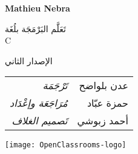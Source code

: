 \thispagestyle{empty}
\cleardoublepage
\thispagestyle{empty}
\begin{center}
{\fontsize{0.7cm}{1.4cm}\selectfont\bfseries
\textcolor{section}{\textenglish{Mathieu Nebra}}
}

\vspace{1cm}
\textcolor{chapter}{\mdseries
{\fontsize{2cm}{4cm}\selectfont
تَعَلَّم البَرْمَجَة بلُغَة}\\
{\fontsize{3cm}{6cm}\selectfont
\textenglish{C}
}
}

\vspace{1cm}
{
\fontsize{0.85cm}{1cm}\selectfont
الإصدار الثاني
}
\vfill

{
\fontsize{0.5cm}{1.5cm}\selectfont

\begin{tabu} to 0.5
تَرْجَمَة & عدن بلواضح\\
مُرَاجَعَة وإعْدَاد & حمزة عبّاد\\
تَصميم الغلاف & أحمد زبوشي\\
\end{tabu}
}

\vfill
\texttt{[image: OpenClassrooms-logo]}
\end{center}
